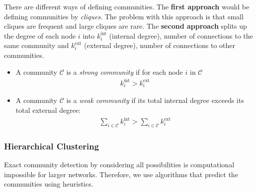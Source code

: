 \documentclass[english]{panikzettel}
\begin{document}
There are different ways of defining communities. 
The \textbf{first approach} would be defining communities by \textit{cliques}. 
The problem with this approach is that small cliques are frequent and large cliques are rare. 
The \textbf{second approach} splits up the degree of each node $ i $ into $ k_i^\text{int} $ (internal degree), number of connections to the same community and $ k_i^\text{ext} $ (external degree), number of connections to other communities.
\begin{itemize}
	\item A community $ \mathcal{C} $ is a \textit{strong community} if for each node $ i $ in $ \mathcal{C} $
	\begin{align*}
		k_i^\text{int} > k_i^\text{ext}
	\end{align*}
	\item A community $ \mathcal{C} $ is a \textit{weak community} if its total internal degree exceeds its total external degree:
	\begin{align*}
		\sum\limits_{i \in \mathcal{C}} k_i^\text{int} > \sum\limits_{i \in \mathcal{C}} k_i^\text{ext}
	\end{align*}
\end{itemize}

\subsubsection{Hierarchical Clustering}
Exact community detection by considering all possibilities is computational impossible for larger networks. 
Therefore, we use algorithms that predict the communities using heuristics.
\end{document}

